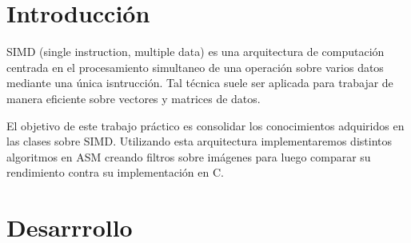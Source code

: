 \documentclass[a4paper]{article}
\begin{document}
\thispagestyle{empty}

\maketitle
\newpage

\thispagestyle{empty}
\vfill


\thispagestyle{empty}
\vspace{3cm}
\tableofcontents
\newpage


\newpage

\section{Introducción}

SIMD (single instruction, multiple data) es una arquitectura de computaci\'on centrada en el procesamiento simultaneo de una operaci\'on sobre varios datos mediante una \'unica isntrucci\'on. Tal t\'ecnica suele ser aplicada para trabajar de manera eficiente sobre vectores y matrices de datos. \par
El objetivo de este trabajo pr\'actico es consolidar los conocimientos adquiridos en las clases sobre SIMD. Utilizando esta arquitectura implementaremos distintos algoritmos en ASM creando filtros sobre imágenes para luego comparar su rendimiento contra su implementación en C.


\section{Desarrrollo}
\end{document}
